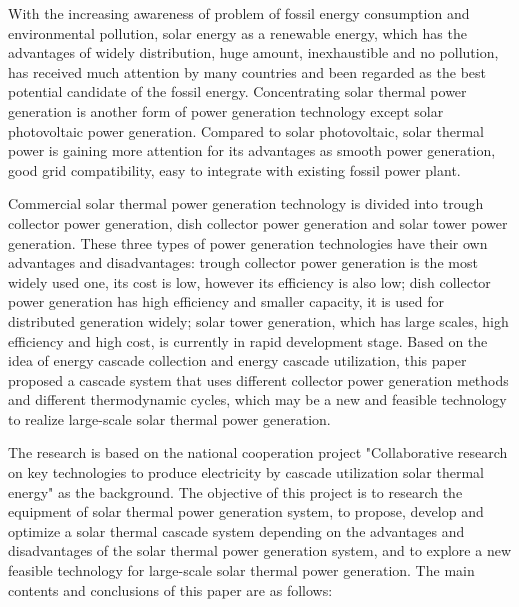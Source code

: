 \enabstract
{
With the increasing awareness of problem of fossil energy consumption and environmental pollution, solar energy as a renewable energy, which has the advantages of widely distribution, huge amount, inexhaustible and no pollution, has received much attention by many countries and been regarded as the best potential candidate of the fossil energy. Concentrating solar thermal power generation is another form of power generation technology except solar photovoltaic power generation. Compared to solar photovoltaic, solar thermal power is gaining more attention for its advantages as smooth power generation, good grid compatibility, easy to integrate with existing fossil power plant.

Commercial solar thermal power generation technology is divided into trough collector power generation, dish collector power generation and solar tower power generation. These three types of power generation technologies have their own advantages and disadvantages: trough collector power generation is the most widely used one, its cost is low, however its efficiency is also low; dish collector power generation has high efficiency and smaller capacity, it is used for distributed generation widely; solar tower generation, which has large scales, high efficiency and high cost, is currently in rapid development stage. Based on the idea of ​​energy cascade collection and energy cascade utilization, this paper proposed a cascade system that uses different collector power generation methods and different thermodynamic cycles, which may be a new and feasible technology to realize large-scale solar thermal power generation.

The research is based on the national cooperation project "Collaborative research on key technologies to produce electricity by cascade utilization solar thermal energy" as the background. The objective of this project is to research the equipment of solar thermal power generation system, to propose, develop and optimize a solar thermal cascade system depending on the advantages and disadvantages of the solar thermal power generation system, and to explore a new feasible technology for large-scale solar thermal power generation. The main contents and conclusions of this paper are as follows:

}
